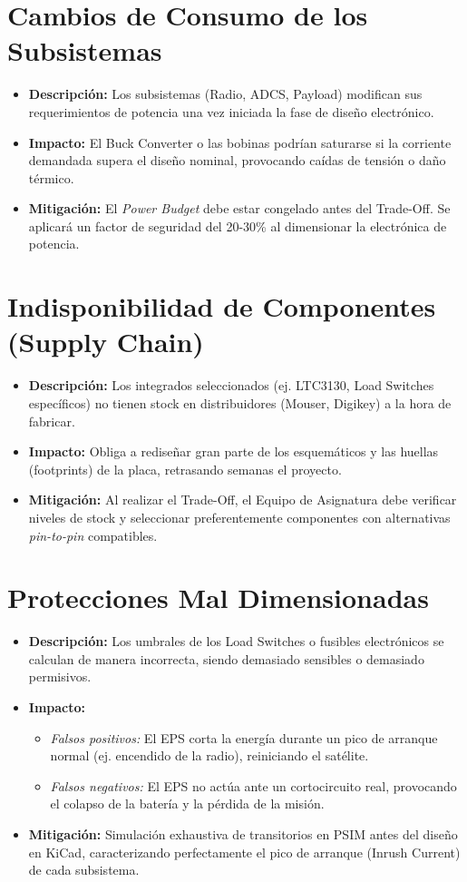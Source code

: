 \section{ Cambios de Consumo de los Subsistemas}
\begin{itemize}
    \item \textbf{Descripción:} Los subsistemas (Radio, ADCS, Payload) modifican sus requerimientos de potencia una vez iniciada la fase de diseño electrónico.
    \item \textbf{Impacto:} El Buck Converter o las bobinas podrían saturarse si la corriente demandada supera el diseño nominal, provocando caídas de tensión o daño térmico.
    \item \textbf{Mitigación:} El \textit{Power Budget} debe estar congelado antes del Trade-Off. Se aplicará un factor de seguridad del 20-30\% al dimensionar la electrónica de potencia.
\end{itemize}

\section{ Indisponibilidad de Componentes (Supply Chain)}
\begin{itemize}
    \item \textbf{Descripción:} Los integrados seleccionados (ej. LTC3130, Load Switches específicos) no tienen stock en distribuidores (Mouser, Digikey) a la hora de fabricar.
    \item \textbf{Impacto:} Obliga a rediseñar gran parte de los esquemáticos y las huellas (footprints) de la placa, retrasando semanas el proyecto.
    \item \textbf{Mitigación:} Al realizar el Trade-Off, el Equipo de Asignatura debe verificar niveles de stock y seleccionar preferentemente componentes con alternativas \textit{pin-to-pin} compatibles.
\end{itemize}

\section{ Protecciones Mal Dimensionadas}
\begin{itemize}
    \item \textbf{Descripción:} Los umbrales de los Load Switches o fusibles electrónicos se calculan de manera incorrecta, siendo demasiado sensibles o demasiado permisivos.
    \item \textbf{Impacto:} 
    \begin{itemize}
        \item \textit{Falsos positivos:} El EPS corta la energía durante un pico de arranque normal (ej. encendido de la radio), reiniciando el satélite.
        \item \textit{Falsos negativos:} El EPS no actúa ante un cortocircuito real, provocando el colapso de la batería y la pérdida de la misión.
    \end{itemize}
    \item \textbf{Mitigación:} Simulación exhaustiva de transitorios en PSIM antes del diseño en KiCad, caracterizando perfectamente el pico de arranque (Inrush Current) de cada subsistema.
\end{itemize}